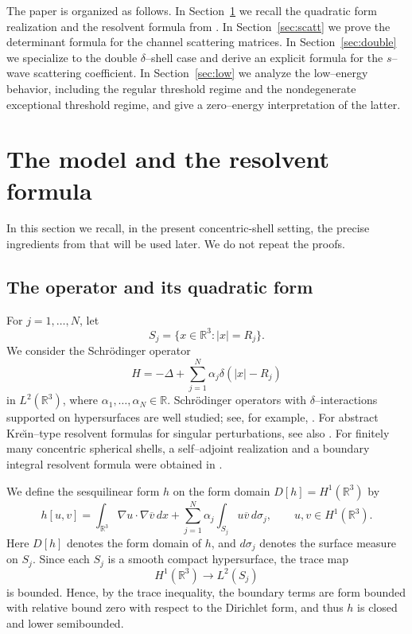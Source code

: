 \documentclass[a4paper,11pt]{article}
\numberwithin{equation}{section}
\newcommand{\R}{\mathbb{R}}
\theoremstyle{definition}
\theoremstyle{remark}
\begin{document}
The paper is organized as follows. In Section~\ref{sec:model} we recall the
quadratic form realization and the resolvent formula from
\cite{KaminagaAAMP2026}. In Section~\ref{sec:scatt} we prove the determinant
formula for the channel scattering matrices. In
Section~\ref{sec:double} we specialize to the double $\delta$--shell case and
derive an explicit formula for the $s$--wave scattering coefficient. In
Section~\ref{sec:low} we analyze the low--energy behavior, including the
regular threshold regime and the nondegenerate exceptional threshold regime,
and give a zero--energy interpretation of the latter.
\section{The model and the resolvent formula}\label{sec:model}

In this section we recall, in the present concentric-shell setting,
the precise ingredients from \cite{KaminagaAAMP2026} that will be used later.
We do not repeat the proofs.

\subsection{The operator and its quadratic form}

For $j=1,\ldots,N$, let
$$
S_j=\{x\in\R^3:|x|=R_j\}.
$$
We consider the Schr\"odinger operator
$$
H=-\Delta+\sum_{j=1}^N \alpha_j\delta(|x|-R_j)
$$
in $L^2(\R^3)$, where $\alpha_1,\ldots,\alpha_N\in\R$.
Schr\"odinger operators with $\delta$--interactions supported on
hypersurfaces are well studied; see, for example,
\cite{AlbeverioEtAl2005,BrascheEtAl1994,BehrndtLangerLotoreichik2013}.
For abstract Kre\u{\i}n--type resolvent formulas for singular perturbations,
see also \cite{Posilicano2001}. For finitely many concentric spherical
shells, a self--adjoint realization and a boundary integral resolvent formula
were obtained in \cite{KaminagaAAMP2026}.

We define the sesquilinear form $h$ on the form domain
$D[h]=H^1(\R^3)$ by
\begin{equation}\label{eq:form}
h[u,v]
=
\int_{\R^3}\nabla u\cdot\nabla\overline{v}\,dx
+
\sum_{j=1}^N \alpha_j\int_{S_j}u\overline{v}\,d\sigma_j,
\qquad
u,v\in H^1(\R^3).
\end{equation}
Here $D[h]$ denotes the form domain of $h$, and $d\sigma_j$ denotes the
surface measure on $S_j$. Since each $S_j$ is a smooth compact hypersurface,
the trace map
\[
H^1(\R^3)\to L^2(S_j)
\]
is bounded. 
Hence, by the trace inequality, the boundary terms are form bounded with
relative bound zero with respect to the Dirichlet form, and thus $h$ is
closed and lower semibounded.
\end{document}
